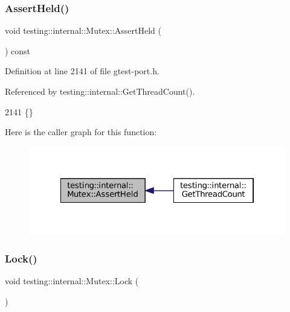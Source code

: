 \subsubsection{\texorpdfstring{Assert\+Held()}{AssertHeld()}}
{\footnotesize\ttfamily void testing\+::internal\+::\+Mutex\+::\+Assert\+Held (\begin{DoxyParamCaption}{ }\end{DoxyParamCaption}) const\hspace{0.3cm}{\ttfamily [inline]}}



Definition at line 2141 of file gtest-\/port.\+h.



Referenced by testing\+::internal\+::\+Get\+Thread\+Count().


\begin{DoxyCode}
2141 \{\}
\end{DoxyCode}
Here is the caller graph for this function\+:
\nopagebreak
\begin{figure}[H]
\begin{center}
\leavevmode
\includegraphics[width=322pt]{classtesting_1_1internal_1_1Mutex_af45bf1660ac4110338a02a8680b2f486_icgraph}
\end{center}
\end{figure}
\mbox{\label{classtesting_1_1internal_1_1Mutex_ae7e2191886c00182176b23c4f4d049f8}} 
\subsubsection{\texorpdfstring{Lock()}{Lock()}}
{\footnotesize\ttfamily void testing\+::internal\+::\+Mutex\+::\+Lock (\begin{DoxyParamCaption}{ }\end{DoxyParamCaption})\hspace{0.3cm}{\ttfamily [inline]}}



